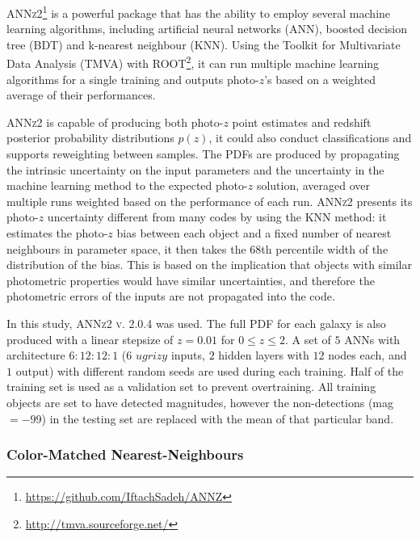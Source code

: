 \documentclass[usenatbib]{mn2e}
\begin{document}
\textsc{ANNz2}\footnote{\url{https://github.com/IftachSadeh/ANNZ}} \citep{Sadeh:16} is a powerful package that has the ability to employ several machine learning algorithms, including artificial neural networks (ANN), boosted decision tree (BDT) and k-nearest neighbour (KNN). Using the Toolkit for Multivariate Data Analysis (TMVA) with ROOT\footnote{\url{http://tmva.sourceforge.net/}}, it can run multiple machine learning algorithms for a single training and outputs photo-$z$'s based on a weighted average of their performances.

\textsc{ANNz2} is capable of producing both photo-$z$ point estimates and redshift posterior probability distributions $p(z)$, it could also conduct classifications and supports reweighting between samples. The PDFs are produced by propagating the intrinsic uncertainty on the input parameters and the uncertainty in the machine learning method to the expected photo-$z$ solution, averaged over multiple runs weighted based on the performance of each run. \textsc{ANNz2} presents its photo-$z$ uncertainty different from many codes by using the KNN method: it estimates the photo-$z$ bias between each object and a fixed number of nearest neighbours in parameter space, it then takes the $68$th percentile width of the distribution of the bias. This is based on the implication that objects with similar photometric properties would have similar uncertainties, and therefore the photometric errors of the inputs are not propagated into the code. 

In this study, \textsc{ANNz2 v. 2.0.4} was used. The full PDF for each galaxy is also produced with a linear stepsize of $z=0.01$ for $0 \leq z \leq 2$. A set of $5$ ANNs with architecture $6:12:12:1$ ($6$ $ugrizy$ inputs, $2$ hidden layers with $12$ nodes each, and $1$ output) with different random seeds are used during each training. %
Half of the training set is used as a validation set to prevent overtraining. All training objects are set to have detected magnitudes, however the non-detections (mag$=-99$) in the testing set are replaced with the mean of that particular band.


\subsubsection{Color-Matched Nearest-Neighbours}
\label{sec:cmnn}
\end{document}
